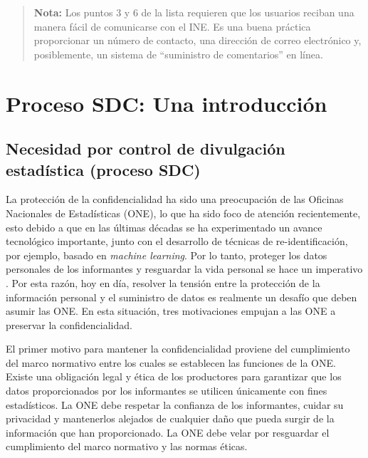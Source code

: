 \documentclass[]{book}
\theoremstyle{definition}
\theoremstyle{definition}
\theoremstyle{definition}
\theoremstyle{definition}
\theoremstyle{remark}
\begin{document}
\begin{quote}
\textbf{Nota:} Los puntos 3 y 6 de la lista requieren que los usuarios reciban una manera fácil de comunicarse con el INE. Es una buena práctica proporcionar un número de contacto, una dirección de correo electrónico y, posiblemente, un sistema de ``suministro de comentarios'' en línea.
\end{quote}

\hypertarget{proceso-sdc-una-introducciuxf3n}{%
\chapter{Proceso SDC: Una introducción}\label{proceso-sdc-una-introducciuxf3n}}

\hypertarget{necesidad-por-control-de-divulgaciuxf3n-estaduxedstica-proceso-sdc}{%
\section{Necesidad por control de divulgación estadística (proceso SDC)}\label{necesidad-por-control-de-divulgaciuxf3n-estaduxedstica-proceso-sdc}}

La protección de la confidencialidad ha sido una preocupación de las Oficinas Nacionales de Estadísticas (ONE), lo que ha sido foco de atención recientemente, esto debido a que en las últimas décadas se ha experimentado un avance tecnológico importante, junto con el desarrollo de técnicas de re-identificación, por ejemplo, basado en \emph{machine learning}. Por lo tanto, proteger los datos personales de los informantes y resguardar la vida personal se hace un imperativo \citep{Yazdani}. Por esta razón, hoy en día, resolver la tensión entre la protección de la información personal y el suministro de datos es realmente un desafío que deben asumir las ONE. En esta situación, tres motivaciones empujan a las ONE a preservar la confidencialidad.

El primer motivo para mantener la confidencialidad proviene del cumplimiento del marco normativo entre los cuales se establecen las funciones de la ONE. Existe una obligación legal y ética de los productores para garantizar que los datos proporcionados por los informantes se utilicen únicamente con fines estadísticos. La ONE debe respetar la confianza de los informantes, cuidar su privacidad y mantenerlos alejados de cualquier daño que pueda surgir de la información que han proporcionado. La ONE debe velar por resguardar el cumplimiento del marco normativo y las normas éticas.
\end{document}
